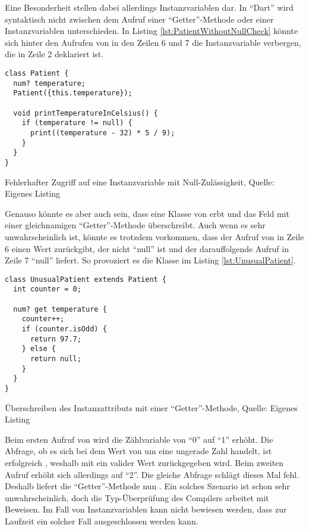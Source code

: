 Eine Besonderheit stellen dabei allerdings Instanzvariablen dar.
In \enquote{Dart} wird syntaktisch nicht zwischen dem Aufruf einer \enquote{Getter}-Methode oder einer Instanzvariablen unterschieden.
In Listing \ref{lst:PatientWithoutNullCheck}
könnte sich hinter den Aufrufen von  in den Zeilen 6 und 7 die Instanzvariable verbergen, die in Zeile 2 deklariert ist.

\ifIncludeFigures
  \begin{listing}[ht]
    \begin{verbatim}
class Patient {
  num? temperature;
  Patient({this.temperature});

  void printTemperatureInCelsius() {
    if (temperature != null) {
      print((temperature - 32) * 5 / 9);
    }
  }
}
    \end{verbatim}
    \caption[Fehlerhafter Zugriff auf eine Instanzvariable mit Null-Zulässigkeit]{Fehlerhafter Zugriff auf eine Instanzvariable mit Null-Zulässigkeit, Quelle: Eigenes Listing}
    \label{lst:PatientWithoutNullCheck}
  \end{listing}
\fi

Genauso könnte es aber auch sein, dass eine Klasse von  erbt und das Feld  mit einer gleichnamigen \enquote{Getter}-Methode überschreibt.
Auch wenn es sehr unwahrscheinlich ist, könnte es trotzdem vorkommen, dass der Aufruf von  in Zeile 6 einen Wert zurückgibt,
der nicht \enquote{null} ist und der darauffolgende Aufruf in Zeile 7 \enquote{null} liefert.
So provoziert es die Klasse  im Listing \ref{lst:UnusualPatient}.
\ifIncludeFigures
  \begin{listing}[ht]
    \begin{verbatim}
class UnusualPatient extends Patient {
  int counter = 0;

  num? get temperature {
    counter++;
    if (counter.isOdd) {
      return 97.7;
    } else {
      return null;
    }
  }
}
\end{verbatim}
    \caption[Überschreiben des Instanzattributs mit einer \enquote{Getter}-Methode]{Überschreiben des Instanzattributs mit einer \enquote{Getter}-Methode, Quelle: Eigenes Listing}
    \label{lst:UnusualPatient}
  \end{listing}
\fi

Beim ersten Aufruf von  wird die Zählvariable  von \enquote{0} auf \enquote{1} erhöht.
Die Abfrage, ob es sich bei dem Wert von  um eine ungerade Zahl handelt, ist erfolgreich , weshalb mit  ein valider Wert zurückgegeben wird.
Beim zweiten Aufruf erhöht sich  allerdings auf \enquote{2}.
Die gleiche Abfrage schlägt dieses Mal fehl.
Deshalb liefert die \enquote{Getter}-Methode nun  .
Ein solches Szenario ist schon sehr unwahrscheinlich, doch die Typ-Überprüfung des Compilers arbeitet mit Beweisen.
Im Fall von Instanzvariablen kann nicht bewiesen werden, dass zur Laufzeit ein solcher Fall ausgeschlossen werden kann.








